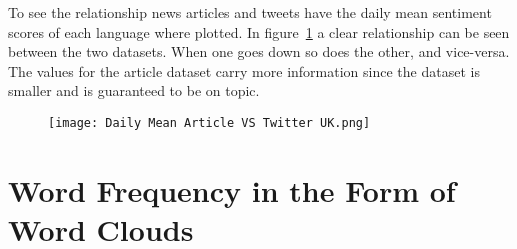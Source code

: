 To see the relationship news articles and tweets have the daily mean sentiment scores of each language where plotted.
In figure~\ref{fig:artcilevstwitter} a clear relationship can be seen between the two datasets.
When one goes down so does the other, and vice-versa.
The values for the article dataset carry more information since the dataset is smaller and is guaranteed to be on topic.

\begin{figure}[h!]
\texttt{[image: Daily Mean Article VS Twitter UK.png]}
\caption[Daily Mean Article VS Twitter]{ }
\label{fig:artcilevstwitter}
\end{figure}

\section{Word Frequency in the Form of Word Clouds}

